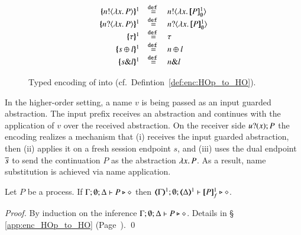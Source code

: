 \begin{figure}[h!]
\[\begin{array}{c}
\begin{array}{rcl}
			\mapa{\bactout{n}{\abs{x}{P}}}^{1} &\defeq& \bactout{n}{\abs{x}{\pmapp{P}{1}{\es}}}
			\\
			\mapa{\bactinp{n}{\abs{x}{P}}}^{1} &\defeq& \bactinp{n}{\abs{x}{\pmapp{P}{1}{\es}}}
			\\
			\mapa{\tau}^{1} &\defeq& \tau
			\\
			\mapa{\bactsel{s}{l} }^{1} &\defeq& \bactsel{n}{l} 
			\\
			\mapa{\bactbra{s}{l} }^{1} &\defeq& \bactbra{n}{l} 
		\end{array}
	\end{array}
\]
	\caption{
		\label{fig:enc:HOp_to_HO}
		Typed encoding of \HOp into \HO (cf.~Defintion~\ref{def:enc:HOp_to_HO}).
	}
\end{figure}



In the higher-order setting, a name $v$ is being passed as an input
guarded abstraction. The input prefix receives an abstraction and
continues with the application of $v$ over the received abstraction.
On the receiver side $u ? (x) ; P$ 
the encoding realizes a mechanism that (i) receives
the input guarded abstraction, then (ii) applies it on a fresh session endpoint $s$, 
and (iii) uses
the dual endpoint $\overline{s}$ to send the continuation $P$ as the abstraction
$\lambda x.\,P$. 
As a result, name substitution is achieved via name application.


\begin{proposition}
	\label{prop:typepres_HOp_to_HO}
	Let $P$ be a \HOp process.
	If $\Gamma; \emptyset; \Delta \vdash P \triangleright \diamond$ then 
	$\mapt{\Gamma}^{1}; \emptyset; \mapt{\Delta}^{1} \proves \pmapp{P}{1}{f} \hastype \Proc$. 
\end{proposition}

\begin{proof}
	By induction on the inference $\Gamma; \emptyset; \Delta \vdash P \triangleright \diamond$.
	Details in \S\,\ref{app:enc_HOp_to_HO} (Page~\pageref{app:enc_HOp_to_HO}).
	\qed
\end{proof}


